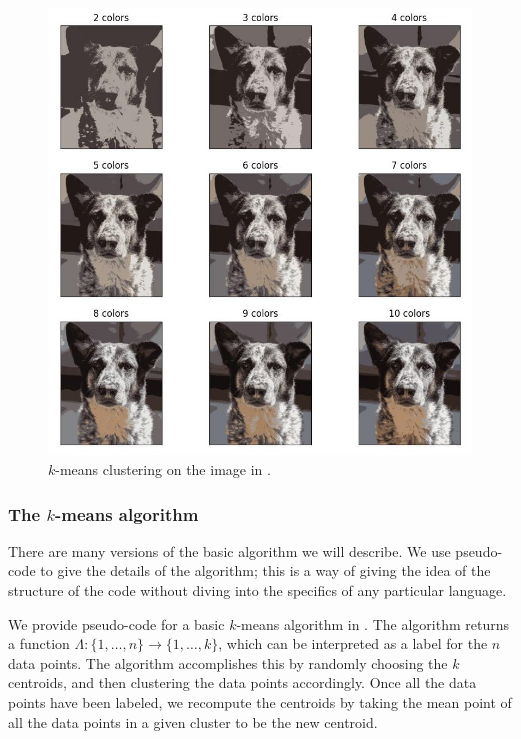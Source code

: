 \documentclass[a4paper, 12pt]{article}
\numberwithin{equation}{section}
\numberwithin{figure}{section}
\theoremstyle{definition}
\begin{document}
\begin{figure}[h]
	\centering
	\includegraphics[scale=0.6]{graphics/k_means_Sherlocks.jpg}
	\caption{$k$-means clustering on the image in .}
	\label{fig:k-means-sherlock}
\end{figure}

\subsubsection{The $k$-means algorithm}

There are many versions of the basic algorithm we will describe. We use
pseudo-code to give the details of the algorithm; this is a way of giving the
idea of the structure of the code without diving into the specifics of any
particular language. 

We provide pseudo-code for a basic $k$-means algorithm in .
The algorithm returns a function $\Lambda : \{1,\dots, n\} \to \{1,\dots, k\}$,
which can be interpreted as a label for the $n$ data points. The algorithm
accomplishes this by randomly choosing the $k$ centroids, and then clustering
the data points accordingly. Once all the data points have been labeled, we
recompute the centroids by taking the mean point of all the data points in a
given cluster to be the new centroid. 
\end{document}
